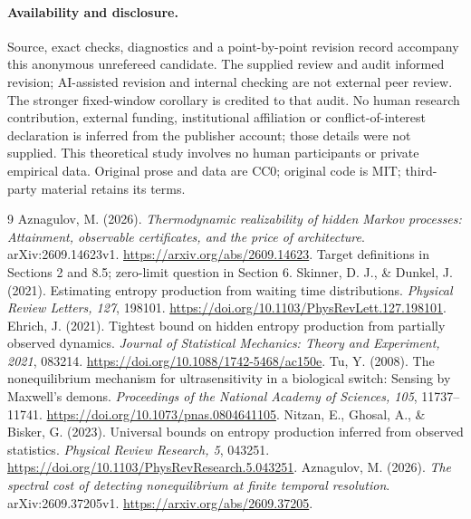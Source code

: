 \documentclass[11pt,a4paper]{article}
\begin{document}
\paragraph{Availability and disclosure.} Source, exact checks, diagnostics and a point-by-point revision record accompany this anonymous unrefereed candidate. The supplied review and audit informed revision; AI-assisted revision and internal checking are not external peer review. The stronger fixed-window corollary is credited to that audit. No human research contribution, external funding, institutional affiliation or conflict-of-interest declaration is inferred from the publisher account; those details were not supplied. This theoretical study involves no human participants or private empirical data. Original prose and data are CC0; original code is MIT; third-party material retains its terms.

\begin{thebibliography}{9}
Aznagulov, M. (2026). \emph{Thermodynamic realizability of hidden Markov processes: Attainment, observable certificates, and the price of architecture}. arXiv:2609.14623v1. \url{https://arxiv.org/abs/2609.14623}. Target definitions in Sections 2 and 8.5; zero-limit question in Section 6.
Skinner, D. J., \& Dunkel, J. (2021). Estimating entropy production from waiting time distributions. \emph{Physical Review Letters, 127}, 198101. \url{https://doi.org/10.1103/PhysRevLett.127.198101}.
Ehrich, J. (2021). Tightest bound on hidden entropy production from partially observed dynamics. \emph{Journal of Statistical Mechanics: Theory and Experiment, 2021}, 083214. \url{https://doi.org/10.1088/1742-5468/ac150e}.
Tu, Y. (2008). The nonequilibrium mechanism for ultrasensitivity in a biological switch: Sensing by Maxwell's demons. \emph{Proceedings of the National Academy of Sciences, 105}, 11737--11741. \url{https://doi.org/10.1073/pnas.0804641105}.
Nitzan, E., Ghosal, A., \& Bisker, G. (2023). Universal bounds on entropy production inferred from observed statistics. \emph{Physical Review Research, 5}, 043251. \url{https://doi.org/10.1103/PhysRevResearch.5.043251}.
Aznagulov, M. (2026). \emph{The spectral cost of detecting nonequilibrium at finite temporal resolution}. arXiv:2609.37205v1. \url{https://arxiv.org/abs/2609.37205}.
\end{thebibliography}
\end{document}
